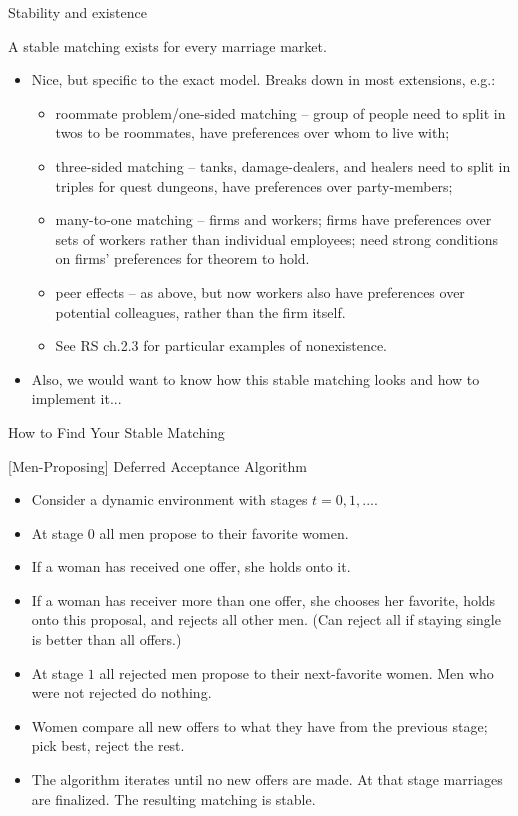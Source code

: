\documentclass[english,10pt
,aspectratio=169
]{beamer}
\begin{document}
\begin{frame}{Stability and existence}
\begin{theorem}
	A stable matching exists for every marriage market.
\end{theorem}
\begin{itemize}
	\item Nice, but specific to the exact model. Breaks down in most extensions, e.g.:
	\begin{itemize}
		\item roommate problem/one-sided matching -- group of people need to split in twos to be roommates, have preferences over whom to live with;
		\item three-sided matching -- tanks, damage-dealers, and healers need to split in triples for quest dungeons, have preferences over party-members;
		\item many-to-one matching -- firms and workers; firms have preferences over sets of workers rather than individual employees; need strong conditions on firms' preferences for theorem to hold.
		\item peer effects -- as above, but now workers also have preferences over potential colleagues, rather than the firm itself.
		\item See RS ch.2.3 for particular examples of nonexistence.
	\end{itemize}
	\item Also, we would want to know how this stable matching looks and how to implement it...
\end{itemize}
\end{frame}


\begin{frame}{How to Find Your Stable Matching}
\begin{block}{[Men-Proposing] Deferred Acceptance Algorithm}
	\begin{itemize}
		\item Consider a dynamic environment with stages $t=0,1,...$.
		\item At stage $0$ all men propose to their favorite women.
		\item If a woman has received one offer, she holds onto it.
		\item If a woman has receiver more than one offer, she chooses her favorite, holds onto this proposal, and rejects all other men. (Can reject all if staying single is better than all offers.)
		\item At stage $1$ all rejected men propose to their next-favorite women. Men who were not rejected do nothing.
		\item Women compare all new offers to what they have from the previous stage; pick best, reject the rest.
		\item The algorithm iterates until no new offers are made. At that stage marriages are finalized. The resulting matching is stable.
	\end{itemize}
\end{block}
\end{frame}
\end{document}
